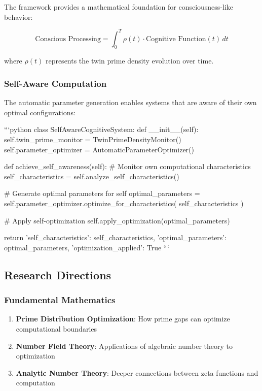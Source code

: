 \documentclass[12pt,a4paper]{article}
\begin{document}
The framework provides a mathematical foundation for consciousness-like behavior:

\[
\text{Conscious Processing} = \int_0^T \rho(t) \cdot \text{Cognitive Function}(t) \, dt
\]

where $\rho(t)$ represents the twin prime density evolution over time.

\subsubsection{Self-Aware Computation}

The automatic parameter generation enables systems that are aware of their own optimal configurations:

```python
class SelfAwareCognitiveSystem:
    def __init__(self):
        self.twin_prime_monitor = TwinPrimeDensityMonitor()
        self.parameter_optimizer = AutomaticParameterOptimizer()
        
    def achieve_self_awareness(self):
        # Monitor own computational characteristics
        self_characteristics = self.analyze_self_characteristics()
        
        # Generate optimal parameters for self
        optimal_parameters = self.parameter_optimizer.optimize_for_characteristics(
            self_characteristics
        )
        
        # Apply self-optimization
        self.apply_optimization(optimal_parameters)
        
        return {
            'self_characteristics': self_characteristics,
            'optimal_parameters': optimal_parameters,
            'optimization_applied': True
        }
```

\subsection{Research Directions}

\subsubsection{Fundamental Mathematics}

\begin{enumerate}
    \item \textbf{Prime Distribution Optimization}: How prime gaps can optimize computational boundaries
    \item \textbf{Number Field Theory}: Applications of algebraic number theory to optimization
    \item \textbf{Analytic Number Theory}: Deeper connections between zeta functions and computation
\end{enumerate}
\end{document}
